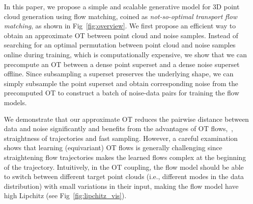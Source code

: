 

In this paper, we propose a simple and scalable generative model for 3D point cloud generation using flow matching, coined as \textit{not-so-optimal transport flow matching}, as shown in Fig~\ref{fig:overview}.
We first propose an efficient way to obtain an approximate OT between point cloud and noise samples.
Instead of searching for an optimal permutation between point cloud and noise samples online during training, which is computationally expensive, we show that we can precompute an OT between a dense point superset and a dense noise superset offline.
Since subsampling a superset preserves the underlying shape, we can simply subsample the point superset and obtain corresponding noise from the precomputed OT to construct a batch of noise-data pairs for training the flow models.



%
We demonstrate that our approximate OT reduces the pairwise distance between data and noise significantly and benefits from the advantages of OT flows,~\eg, straightness of trajectories and fast sampling. 
%
However, a careful examination shows that learning (equivariant) OT flows is generally challenging since straightening flow trajectories makes the learned flows complex at the beginning of the trajectory. 
%
Intuitively, in the OT coupling, the flow model should be able to switch between different target point clouds (i.e., different modes in the data distribution) with small variations in their input, making the flow model have high Lipchitz (see Fig~\ref{fig:lipchitz_vis}).




